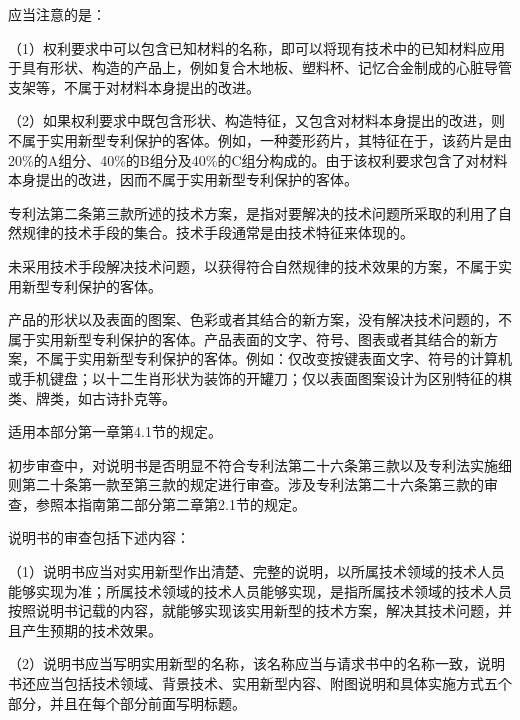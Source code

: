应当注意的是：

{\setlength{\parindent}{17.1bp}（1）权利要求中可以包含已知材料的名称，即可以将现有技术中的已知材料应用于具有形状、构造的产品上，例如复合木地板、塑料杯、记忆合金制成的心脏导管支架等，不属于对材料本身提出的改进。\par}

{\setlength{\parindent}{17.1bp}（2）如果权利要求中既包含形状、构造特征，又包含对材料本身提出的改进，则不属于实用新型专利保护的客体。例如，一种菱形药片，其特征在于，该药片是由20\%的A组分、40\%的B组分及40\%的C组分构成的。由于该权利要求包含了对材料本身提出的改进，因而不属于实用新型专利保护的客体。\par}

专利法第二条第三款所述的技术方案，是指对要解决的技术问题所采取的利用了自然规律的技术手段的集合。技术手段通常是由技术特征来体现的。

未采用技术手段解决技术问题，以获得符合自然规律的技术效果的方案，不属于实用新型专利保护的客体。

产品的形状以及表面的图案、色彩或者其结合的新方案，没有解决技术问题的，不属于实用新型专利保护的客体。产品表面的文字、符号、图表或者其结合的新方案，不属于实用新型专利保护的客体。例如：仅改变按键表面文字、符号的计算机或手机键盘；以十二生肖形状为装饰的开罐刀；仅以表面图案设计为区别特征的棋类、牌类，如古诗扑克等。

适用本部分第一章第4.1节的规定。

初步审查中，对说明书是否明显不符合专利法第二十六条第三款以及专利法实施细则第二十条第一款至第三款的规定进行审查。涉及专利法第二十六条第三款的审查，参照本指南第二部分第二章第2.1节的规定。

说明书的审查包括下述内容：

{\setlength{\parindent}{17.1bp}（1）说明书应当对实用新型作出清楚、完整的说明，以所属技术领域的技术人员能够实现为准；所属技术领域的技术人员能够实现，是指所属技术领域的技术人员按照说明书记载的内容，就能够实现该实用新型的技术方案，解决其技术问题，并且产生预期的技术效果。\par}

{\setlength{\parindent}{17.1bp}（2）说明书应当写明实用新型的名称，该名称应当与请求书中的名称一致，说明书还应当包括技术领域、背景技术、实用新型内容、附图说明和具体实施方式五个部分，并且在每个部分前面写明标题。\par}

